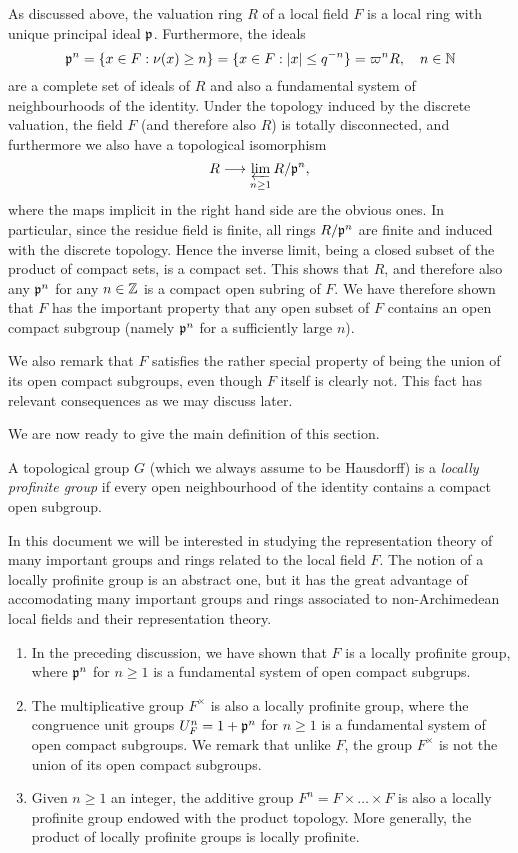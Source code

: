 As discussed above, the valuation ring $R$ of a local field $F$ is a local ring with unique principal ideal $\mathfrak{p}$. Furthermore, the ideals 
$$\mathfrak{p}^n=\{x\in F:\nu(x)\geq n\}=\{x\in F: |x|\leq q^{-n}\}=\varpi^n R,\quad n\in\mathbb{N}$$
are a complete set of ideals of $R$ and also a fundamental system of neighbourhoods of the identity. Under the topology induced by the discrete valuation, the field $F$ (and therefore also $R$) is totally disconnected, and furthermore we also have a topological isomorphism
$$R\longrightarrow\varprojlim_{n\geq 1} R/\mathfrak{p}^n,$$
where the maps implicit in the right hand side are the obvious ones.
In particular, since the residue field is finite, all rings $R/\mathfrak{p}^n$ are finite and induced with the discrete topology. Hence the inverse limit, being a closed subset of the product of compact sets, is a compact set. This shows that $R$, and therefore also any $\mathfrak{p}^n$ for any $n\in\mathbb{Z}$ is a compact open subring of $F$. We have therefore shown that $F$ has the important property that any open subset of $F$ contains an open compact subgroup (namely $\mathfrak{p}^n$ for a sufficiently large $n$). 

We also remark that $F$ satisfies the rather special property of being the union of its open compact subgroups, even though $F$ itself is clearly not. This fact has relevant consequences as we may discuss later.

We are now ready to give the main definition of this section.

\begin{defn}
    A topological group $G$ (which we always assume to be Hausdorff) is a \textit{locally profinite group} if every open neighbourhood of the identity contains a compact open subgroup. 
\end{defn}

In this document we will be interested in studying the representation theory of many important groups and rings related to the local field $F$. The notion of a locally profinite group is an abstract one, but it has the great advantage of accomodating many important groups and rings associated to non-Archimedean local fields and their representation theory.

\begin{examples}

    \begin{enumerate}
        \item In the preceding discussion, we have shown that $F$ is a locally profinite group, where $\mathfrak{p}^n$ for $n\geq1$ is a fundamental system of open compact subgrups.
        \item The multiplicative group $F^{\times}$ is also a locally profinite group, where the congruence unit groups $U_F^n=1+\mathfrak{p}^n$ for $n\geq1$ is a fundamental system of open compact subgroups. We remark that unlike $F$, the group $F^{\times}$ is not the union of its open compact subgroups.
        \item Given $n\geq1$ an integer, the additive group $F^n=F\times\dots\times F$ is also a locally profinite group endowed with the product topology. More generally, the product of locally profinite groups is locally profinite.
    \end{enumerate}
\end{examples}

